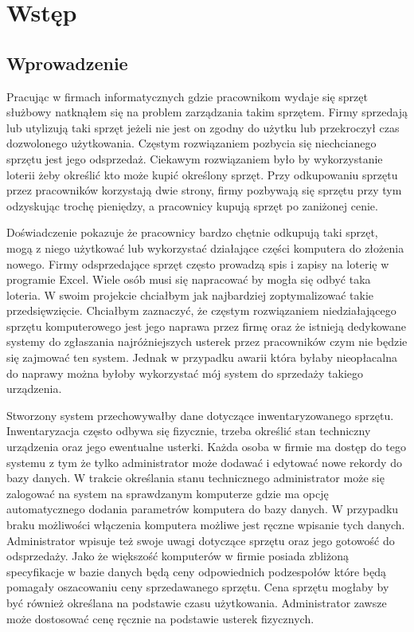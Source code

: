\chapter{Wstęp}
\section{Wprowadzenie}

Pracując w firmach informatycznych gdzie pracownikom wydaje się sprzęt służbowy natknąłem się na problem zarządzania takim sprzętem. Firmy sprzedają lub utylizują taki sprzęt jeżeli nie jest on zgodny do użytku lub przekroczył czas dozwolonego użytkowania. Częstym rozwiązaniem pozbycia się niechcianego sprzętu jest jego odsprzedaż. Ciekawym rozwiązaniem było by wykorzystanie loterii żeby określić kto może kupić określony sprzęt. Przy odkupowaniu sprzętu przez pracowników korzystają dwie strony, firmy pozbywają się sprzętu przy tym odzyskując trochę pieniędzy, a pracownicy kupują sprzęt po zaniżonej cenie. 

Doświadczenie pokazuje że pracownicy bardzo chętnie odkupują taki sprzęt, mogą z niego użytkować lub wykorzystać działające części komputera do złożenia nowego. Firmy odsprzedające sprzęt często prowadzą spis i zapisy na loterię w programie Excel. Wiele osób musi się napracować by mogła się odbyć taka loteria. W swoim projekcie chciałbym jak najbardziej zoptymalizować takie przedsięwzięcie. Chciałbym zaznaczyć, że częstym rozwiązaniem niedziałającego sprzętu komputerowego jest jego naprawa przez firmę oraz że istnieją dedykowane systemy do zgłaszania najróżniejszych usterek przez pracowników czym nie będzie się zajmować ten system. Jednak w przypadku awarii która byłaby nieopłacalna do naprawy można byłoby wykorzystać mój system do sprzedaży takiego urządzenia.

Stworzony system przechowywałby dane dotyczące inwentaryzowanego sprzętu. Inwentaryzacja często odbywa się fizycznie, trzeba określić stan techniczny urządzenia oraz jego ewentualne usterki. Każda osoba w firmie ma dostęp do tego systemu z tym że tylko administrator może dodawać i edytować nowe rekordy do bazy danych. W trakcie określania stanu technicznego administrator może się zalogować na system na sprawdzanym komputerze gdzie ma opcję automatycznego dodania parametrów komputera do bazy danych. W przypadku braku możliwości włączenia komputera możliwe jest ręczne wpisanie tych danych. Administrator wpisuje też swoje uwagi dotyczące sprzętu oraz jego gotowość do odsprzedaży. Jako że większość komputerów w firmie posiada zbliżoną specyfikacje w bazie danych będą ceny odpowiednich podzespołów które będą pomagały oszacowaniu ceny sprzedawanego sprzętu. Cena sprzętu mogłaby by być również określana na podstawie czasu użytkowania. Administrator zawsze może dostosować cenę ręcznie na podstawie usterek fizycznych.

